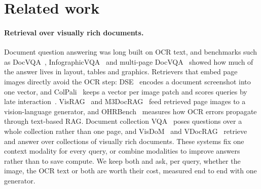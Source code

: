 \section{Related work}
\label{sec:related}

\paragraph{Retrieval over visually rich documents.} Document question answering was long built on OCR text, and
benchmarks such as DocVQA~\cite{docvqa}, InfographicVQA~\cite{infovqa} and multi-page DocVQA~\cite{mpdocvqa} showed
how much of the answer lives in layout, tables and graphics. Retrievers that embed page images directly avoid the OCR
step: DSE~\cite{dse} encodes a document screenshot into one vector, and ColPali~\cite{colpali} keeps a vector per
image patch and scores queries by late interaction~\cite{colbert}. VisRAG~\cite{visrag} and M3DocRAG~\cite{m3docrag}
feed retrieved page images to a vision-language generator, and OHRBench~\cite{ocrhinders} measures how OCR errors
propagate through text-based RAG. Document collection VQA~\cite{doccvqa} poses questions over a whole collection
rather than one page, and VisDoM~\cite{visdom} and VDocRAG~\cite{vdocrag} retrieve and answer over collections of
visually rich documents. These systems fix one context modality for every query, or combine modalities to improve
answers rather than to save compute. We keep both and ask, per
query, whether the image, the OCR text or both are worth their cost, measured end to end with one generator.

